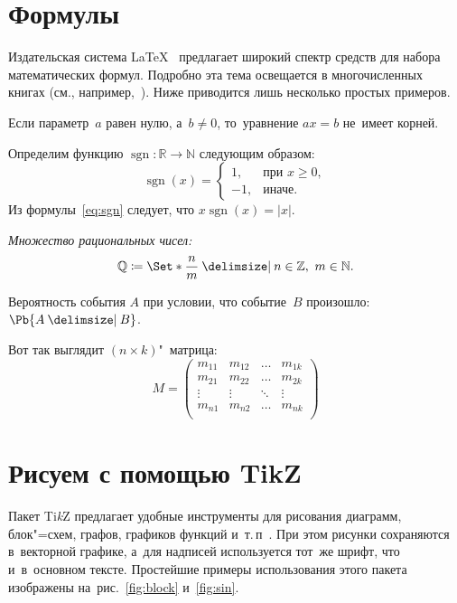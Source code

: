 \documentclass[a4paper,12pt]{diplom}
\newcommand{\N}{\mathbb{N}}
\newcommand{\Z}{\mathbb{Z}}
\newcommand{\R}{\mathbb{R}}
\DeclareMathOperator{\sgn}{sgn}
\newcommand{\from}{\colon}
\renewcommand{\ge}{\geqslant}
\begin{document}
\chapter{Формулы}
Издательская система \LaTeX~\cite{tex_yarsu} предлагает широкий спектр средств для набора математических формул.
Подробно эта тема освещается в многочисленных книгах (см., например,~\cite{oetiker_lshort, kotelnikov2004}).
Ниже приводится лишь несколько простых примеров.

Если параметр~$a$ равен нулю, а~$b \ne 0$, то~уравнение \(a x = b\) не~имеет корней.

Определим функцию $\sgn \from \R \to \N$ следующим образом:
\begin{equation}
\sgn(x) = \begin{cases}
    1, & \text{при } x \ge 0,\\
   -1, & \text{иначе.}
\end{cases}
\label{eq:sgn}
\end{equation}
Из формулы~\eqref{eq:sgn} следует, что $x \sgn(x) = |x|$.

\emph{Множество рациональных чисел:}
\[
  \mathbb{Q} \coloneqq \Set*{ \frac{n}{m} \given n\in\Z, \ m\in\N}.
\]

Вероятность события $A$ при условии, что событие~$B$ произошло:
$\Pb{A \given B}$.

Вот так выглядит $(n\times k)$"~матрица:
\begin{equation}
M = \begin{pmatrix}
  m_{11} & m_{12} & \dots & m_{1k} \\
  m_{21} & m_{22} & \dots & m_{2k} \\
  \vdots & \vdots & \ddots & \vdots \\
  m_{n1} & m_{n2} & \dots & m_{nk} \\
  \end{pmatrix}
  \label{eq:matrix}
\end{equation}

\chapter{Рисуем с помощью TikZ}
Пакет Ti\textit{k}Z предлагает удобные инструменты для рисования диаграмм, блок"=схем, графов, графиков функций и~т.\,п~\cite{tikz, kirutenko2014}.
При этом рисунки сохраняются в~векторной графике, а~для  надписей используется тот~же шрифт, что и~в~основном тексте.
Простейшие примеры использования этого пакета изображены на~рис.~\ref{fig:block} и~\ref{fig:sin}.
\end{document}
